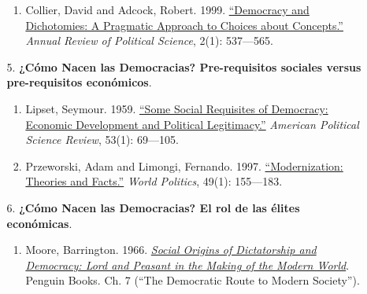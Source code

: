\documentclass[letterpaper]{article}
\begin{document}
\begin{enumerate}
\begin{enumerate}
\begin{enumerate}
						\item Collier, David and Adcock, Robert. 1999. \href{https://github.com/hbahamonde/Ciencia_Politica_I/raw/master/Readings/Collier_Adcock.pdf}{``Democracy and Dichotomies: A Pragmatic Approach to Choices about Concepts.''} \emph{Annual Review of Political Science}, 2(1): 537---565.

					\end{enumerate}
			
				\item[5.] {\bf ¿C\'omo Nacen las Democracias? Pre-requisitos sociales versus pre-requisitos econ\'omicos}.  
					\begin{enumerate}
						\item Lipset, Seymour. 1959. \href{https://github.com/hbahamonde/Ciencia_Politica_I/raw/master/Readings/Lipset.pdf}{``Some Social Requisites of Democracy: Economic Development and Political Legitimacy.''} \emph{American Political Science Review}, 53(1): 69---105.

						\item Przeworski, Adam and Limongi, Fernando. 1997. \href{https://github.com/hbahamonde/Ciencia_Politica_I/raw/master/Readings/Przeworski_Limongi_1997.pdf}{``Modernization: Theories and Facts.''} \emph{World Politics}, 49(1): 155---183.
						
					\end{enumerate}
				
				

				\item[6.] {\bf ¿C\'omo Nacen las Democracias? El rol de las \'elites econ\'omicas}. 
					\begin{enumerate}
						\item Moore, Barrington. 1966. \href{https://github.com/hbahamonde/Ciencia_Politica_I/raw/master/Readings/Moore.pdf}{\emph{Social Origins of Dictatorship and Democracy: Lord and Peasant in the Making of the Modern World}}. Penguin Books. Ch. 7 (``The Democratic Route to Modern Society'').
						

\end{enumerate}
\end{enumerate}
\end{enumerate}
\end{document}
